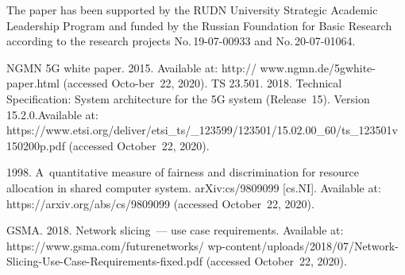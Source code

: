 


\vspace*{-12pt}

\Ack
\noindent
The paper has been supported by the RUDN University Strategic Academic Leadership Program and 
funded by the Russian Foundation for Basic Research according to the research projects 
No.\,19-07-00933 and No.\,20-07-01064.
\vspace*{3pt}

  \begin{multicols}{2}

\renewcommand{\bibname}{\protect\rmfamily References}

{\small\frenchspacing
 {%
 \begin{thebibliography}{99}

NGMN 5G white paper. 2015. Available at: {\sf http:// www.ngmn.de/5gwhite-paper.html} (accessed 
Octo-\linebreak ber~22, 2020).
TS 23.501. 2018. Technical Specification: System architecture for the 5G system (Release~15).
Version 15.2.0.\linebreak Available at: {\sf 
https://www.etsi.org/deliver/etsi\_ts/\_123599/123501/15.02.00\_60/ts\_123501v
 150200p.pdf} 
(accessed October~22, 2020).

 1998. A~quantitative measure of fairness and 
discrimination for resource allocation in shared computer system. arXiv:cs/9809099 [cs.NI]. Available 
at: {\sf https://arxiv.org/abs/cs/9809099} (accessed October~22, 2020).


GSMA. 2018. Network slicing~--- use case requirements.  Available at: {\sf  
https://www.gsma.com/futurenetworks/
wp-content/uploads/2018/07/Network-Slicing-Use-Case-Requirements-fixed.pdf}
(accessed October~22, 2020).


\end{thebibliography}}}
\end{multicols}

